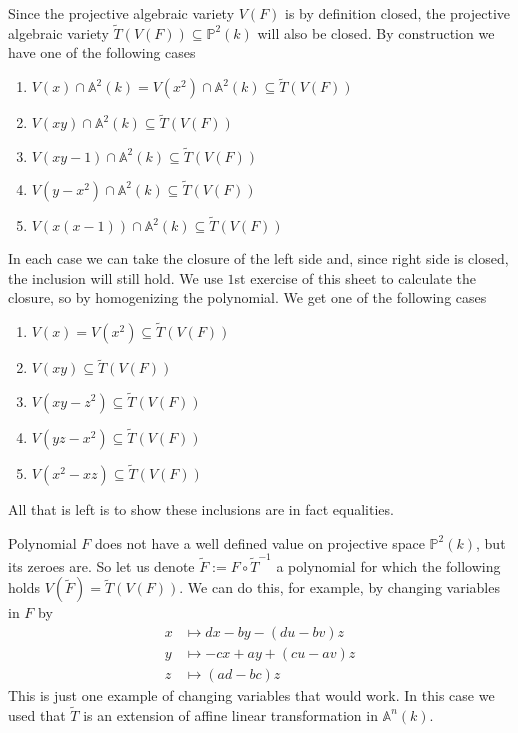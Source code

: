 \begin{exercise}{2}
\begin{enumerate}
            Since the projective algebraic variety $V(F)$ is by definition
            closed, the projective algebraic variety $\widetilde{T}(V(F))
            \subseteq \mathbb{P}^2(k)$ will also be closed. By construction we
            have one of the following cases
            \begin{enumerate}
                \item{} $V(x) \cap \mathbb{A}^2(k) = V(x^2) \cap \mathbb{A}^2(k)
                    \subseteq \widetilde{T}(V(F))$
                \item{} $V(xy) \cap \mathbb{A}^2(k) \subseteq
                    \widetilde{T}(V(F))$
                \item{} $V(xy - 1) \cap \mathbb{A}^2(k) \subseteq
                    \widetilde{T}(V(F))$
                \item{} $V(y - x^2) \cap \mathbb{A}^2(k) \subseteq
                    \widetilde{T}(V(F))$
                \item{} $V(x(x - 1)) \cap \mathbb{A}^2(k) \subseteq
                    \widetilde{T}(V(F))$
            \end{enumerate}
            In each case we can take the closure of the left side and, since
            right side is closed, the inclusion will still hold. We use $1$st
            exercise of this sheet to calculate the closure, so by homogenizing
            the polynomial. We get one of the following cases
            \begin{enumerate}
                \item{} $V(x) = V(x^2) \subseteq \widetilde{T}(V(F))$
                \item{} $V(xy) \subseteq \widetilde{T}(V(F))$
                \item{} $V(xy - z^2) \subseteq \widetilde{T}(V(F))$
                \item{} $V(yz - x^2) \subseteq \widetilde{T}(V(F))$
                \item{} $V(x^2 - xz) \subseteq \widetilde{T}(V(F))$
            \end{enumerate}
            All that is left is to show these inclusions are in fact equalities.

            Polynomial $F$ does not have a well defined value on projective
            space $\mathbb{P}^2(k)$, but its zeroes are. So let us denote
            $\widetilde{F} := F \circ \widetilde{T}^{-1}$ a polynomial for which
            the following holds $V(\widetilde{F}) = \widetilde{T}(V(F))$. We can
            do this, for example, by changing variables in $F$ by
            \begin{align*}
                x &\mapsto dx - by - (du - bv)z \\
                y &\mapsto -cx + ay + (cu - av)z \\
                z &\mapsto (ad - bc)z
            \end{align*}
            This is just one example of changing variables that would work.
            In this case we used that $\widetilde{T}$ is an extension of affine
            linear transformation in $\mathbb{A}^n(k)$.


\end{enumerate}
\end{exercise}
